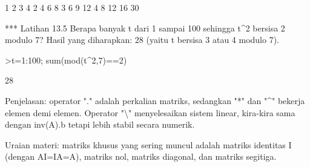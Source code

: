 \documentclass[a4paper,10pt]{article}
\begin{document}
\begin{eulernotebook}
\begin{eulercomment}
\begin{eulercomment}
\begin{eulercomment}
\begin{eulercomment}
\begin{eulercomment}
\begin{eulercomment}
\begin{eulercomment}
\begin{eulercomment}
\begin{eulercomment}
\begin{eulercomment}
\begin{eulercomment}
\begin{eulercomment}
\begin{euleroutput}
              1             2             3             4 
              2             4             6             8 
              3             6             9            12 
              4             8            12            16 
  30
\end{euleroutput}
\begin{eulercomment}
*** Latihan 13.5
Berapa banyak t dari 1 sampai 100 sehingga t\textasciicircum{}2 bersisa 2 modulo 7?
Hasil yang diharapkan: 28 (yaitu t bersisa 3 atau 4 modulo 7).
\end{eulercomment}
\begin{eulerprompt}
>t=1:100; sum(mod(t^2,7)==2)
\end{eulerprompt}
\begin{euleroutput}
  28
\end{euleroutput}
\begin{eulercomment}
Penjelasan: operator "." adalah perkalian matriks, sedangkan "*" dan "\textasciicircum{}"
bekerja elemen demi elemen. Operator "\textbackslash{}" menyelesaikan sistem linear,
kira-kira sama dengan inv(A).b tetapi lebih stabil secara numerik.

\begin{eulercomment}
\begin{eulercomment}
Uraian materi: matriks khusus yang sering muncul adalah matriks identitas I
(dengan AI=IA=A), matriks nol, matriks diagonal, dan matriks segitiga.


\end{eulercomment}
\end{eulercomment}
\end{eulercomment}
\end{eulercomment}
\end{eulercomment}
\end{eulercomment}
\end{eulercomment}
\end{eulercomment}
\end{eulercomment}
\end{eulercomment}
\end{eulercomment}
\end{eulercomment}
\end{eulercomment}
\end{eulercomment}
\end{eulercomment}
\end{eulernotebook}
\end{document}
